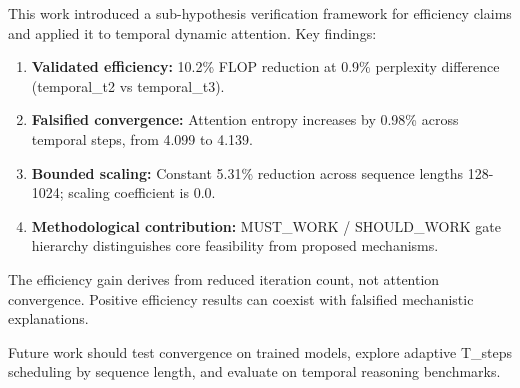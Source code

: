 
This work introduced a sub-hypothesis verification framework for efficiency claims and applied it to temporal dynamic attention. Key findings:

\begin{enumerate}
\item \textbf{Validated efficiency:} 10.2\% FLOP reduction at 0.9\% perplexity difference (temporal\_t2 vs temporal\_t3).
\item \textbf{Falsified convergence:} Attention entropy increases by 0.98\% across temporal steps, from 4.099 to 4.139.
\item \textbf{Bounded scaling:} Constant 5.31\% reduction across sequence lengths 128-1024; scaling coefficient is 0.0.
\item \textbf{Methodological contribution:} MUST\_WORK / SHOULD\_WORK gate hierarchy distinguishes core feasibility from proposed mechanisms.
\end{enumerate}

The efficiency gain derives from reduced iteration count, not attention convergence. Positive efficiency results can coexist with falsified mechanistic explanations.

Future work should test convergence on trained models, explore adaptive T\_steps scheduling by sequence length, and evaluate on temporal reasoning benchmarks.

